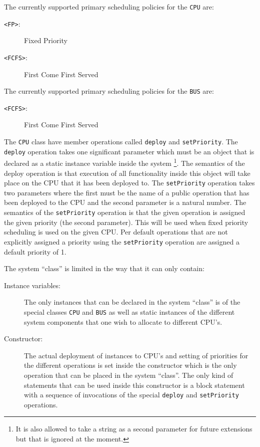 \documentclass[\pformat,12pt]{article}
\begin{document}
\begin{description}
The currently supported primary scheduling policies for the \texttt{CPU}
are:
\begin{description}
\item[\texttt{<FP>}:] Fixed Priority
\item[\texttt{<FCFS>}:] First Come First Served
\end{description} 

The currently supported primary scheduling policies for the \texttt{BUS}
are:
\begin{description}
\item[\texttt{<FCFS>}:] First Come First Served
\end{description} 

The \texttt{CPU} class have member operations called \texttt{deploy} and
\texttt{setPriority}. The \texttt{deploy} operation takes one
significant parameter
which must be an object that is declared as a static instance variable
inside the system \footnote{It is also allowed to take a string as a
second parameter for future extensions but that is ignored at the
moment.}. The semantics of the deploy operation is that execution
of all functionality inside this object will take place on the CPU that it
has been deployed to. The \texttt{setPriority} operation takes two 
parameters where the first must be the name of a public operation that 
has been deployed to the CPU and the second parameter is a natural number.
The semantics of the \texttt{setPriority} operation is that the given 
operation is assigned the given priority (the second parameter). This will
be used when fixed priority scheduling is used on the given CPU. Per
default operations that are not explicitly assigned a priority using
the \texttt{setPriority} operation are assigned a default priority of 1.

The system ``class'' is limited in the way that it can only contain:
\begin{description}
\item[Instance variables:] The only instances that can be declared in the 
system ``class'' is of the special classes \texttt{CPU} and \texttt{BUS} 
as well as static instances of the different system components that one 
wish to allocate to different CPU's.
\item[Constructor:] The actual deployment of instances to CPU's and setting
of priorities for the different operations is set inside the
constructor which is the only operation that can be placed in the
system ``class''. The only kind of statements that can be used inside
this constructor is a block statement with a sequence of invocations
of the special \texttt{deploy} and \texttt{setPriority} operations.
\end{description}


\end{description}
\end{document}
